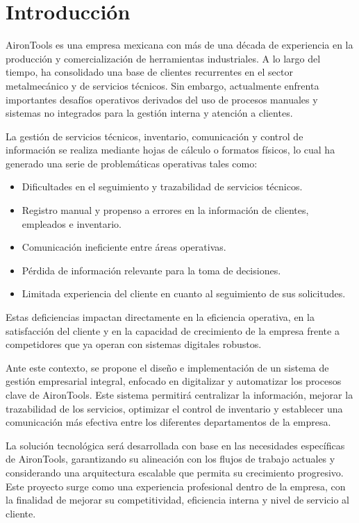 \pagestyle{fancy}
\section{Introducción}

AironTools es una empresa mexicana con más de una década de experiencia en la producción y comercialización de herramientas industriales. A lo largo del tiempo, ha consolidado una base de clientes recurrentes en el sector metalmecánico y de servicios técnicos. Sin embargo, actualmente enfrenta importantes desafíos operativos derivados del uso de procesos manuales y sistemas no integrados para la gestión interna y atención a clientes.

La gestión de servicios técnicos, inventario, comunicación y control de información se realiza mediante hojas de cálculo o formatos físicos, lo cual ha generado una serie de problemáticas operativas tales como:

\begin{itemize}
    \item Dificultades en el seguimiento y trazabilidad de servicios técnicos.
    \item Registro manual y propenso a errores en la información de clientes, empleados e inventario.
    \item Comunicación ineficiente entre áreas operativas.
    \item Pérdida de información relevante para la toma de decisiones.
    \item Limitada experiencia del cliente en cuanto al seguimiento de sus solicitudes.
\end{itemize}

Estas deficiencias impactan directamente en la eficiencia operativa, en la satisfacción del cliente y en la capacidad de crecimiento de la empresa frente a competidores que ya operan con sistemas digitales robustos.

Ante este contexto, se propone el diseño e implementación de un sistema de gestión empresarial integral, enfocado en digitalizar y automatizar los procesos clave de AironTools. Este sistema permitirá centralizar la información, mejorar la trazabilidad de los servicios, optimizar el control de inventario y establecer una comunicación más efectiva entre los diferentes departamentos de la empresa.

La solución tecnológica será desarrollada con base en las necesidades específicas de AironTools, garantizando su alineación con los flujos de trabajo actuales y considerando una arquitectura escalable que permita su crecimiento progresivo. Este proyecto surge como una experiencia profesional dentro de la empresa, con la finalidad de mejorar su competitividad, eficiencia interna y nivel de servicio al cliente.

